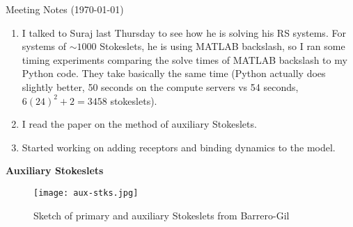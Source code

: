 \documentclass{article}
\begin{document}
\pagestyle{plain}

\begin{center}
  {\Large Meeting Notes (\today)}
\end{center}

\begin{enumerate}
\item I talked to Suraj last Thursday to see how he is solving his RS
  systems. For systems of $\sim 1000$ Stokeslets, he is using MATLAB
  backslash, so I ran some timing experiments comparing the solve times
  of MATLAB backslash to my Python code. They take basically the same
  time (Python actually does slightly better, 50 seconds on the
  compute servers vs 54 seconds, $6 (24)^2 + 2 = 3458$ stokeslets).
\item I read the paper \cite{Barrero-Gil2013} on the method of
  auxiliary Stokeslets.
\item Started working on adding receptors and binding dynamics to the
  model.
\end{enumerate}

\textbf{Auxiliary Stokeslets}

\begin{figure}
  \centering
  \texttt{[image: aux-stks.jpg]}
  \caption{Sketch of primary and auxiliary Stokeslets from
    Barrero-Gil \cite{Barrero-Gil2013}}
  \label{fig:aux-stks}
\end{figure}
\end{document}
